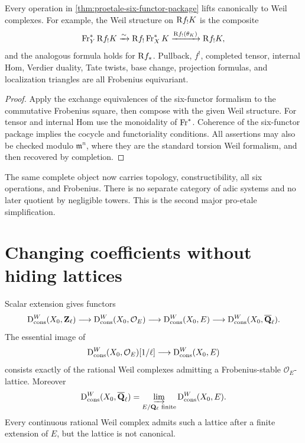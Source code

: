 \begin{theorem}
\label{thm:proetale-weil-six-compatibility}
Every operation in
\cref{thm:proetale-six-functor-package} lifts canonically to Weil complexes.
For example, the Weil structure on \(\mathrm R f_!K\) is the composite
\[
 \operatorname{Fr}_Y^*\mathrm R f_!K
   \xrightarrow{\sim}
 \mathrm R f_!\operatorname{Fr}_X^*K
   \xrightarrow{\mathrm R f_!(\theta_K)}
 \mathrm R f_!K,
\]
and the analogous formula holds for \(\mathrm R f_*\).  Pullback, \(f^!\), completed
tensor, internal Hom, Verdier duality, Tate twists, base change, projection
formulas, and localization triangles are all Frobenius equivariant.
\end{theorem}

\begin{proof}
Apply the exchange equivalences of the six-functor formalism to the
commutative Frobenius square, then compose with the given Weil structure.
For tensor and internal Hom use the monoidality of \(\operatorname{Fr}^*\).  Coherence of
the six-functor package implies the cocycle and functoriality conditions.
All assertions may also be checked modulo \(\mathfrak m^n\), where they are
the standard torsion Weil formalism, and then recovered by completion.
\end{proof}

\begin{proetalebox}
The same complete object now carries topology, constructibility, all six
operations, and Frobenius.  There is no separate category of adic systems and
no later quotient by negligible towers.  This is the second major
pro-etale simplification.
\end{proetalebox}

\section{Changing coefficients without hiding lattices}

\begin{theorem}
\label{thm:proetale-weil-coefficient-tower}
Scalar extension gives functors
\[
 \mathrm D_{\mathrm{cons}}^W(X_0,\mathbf Z_\ell)
   \longrightarrow \mathrm D_{\mathrm{cons}}^W(X_0,\mathcal O_E)
   \longrightarrow \mathrm D_{\mathrm{cons}}^W(X_0,E)
   \longrightarrow \mathrm D_{\mathrm{cons}}^W(X_0,\overline{\mathbf Q}_\ell).
\]
The essential image of
\[
 \mathrm D_{\mathrm{cons}}^W(X_0,\mathcal O_E)[1/\ell]
   \longrightarrow \mathrm D_{\mathrm{cons}}^W(X_0,E)
\]
consists exactly of the rational Weil complexes admitting a
Frobenius-stable \(\mathcal O_E\)-lattice.  Moreover
\[
 \mathrm D_{\mathrm{cons}}^W(X_0,\overline{\mathbf Q}_\ell)
   =\varinjlim_{E/\mathbf Q_\ell\text{ finite}} \mathrm D_{\mathrm{cons}}^W(X_0,E).
\]
Every continuous rational Weil complex admits such a lattice after a finite
extension of \(E\), but the lattice is not canonical.
\end{theorem}

